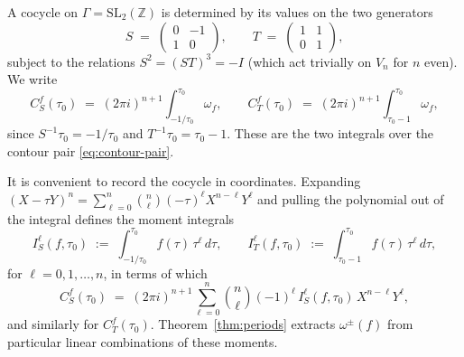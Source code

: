 \documentclass[11pt]{article}
\numberwithin{equation}{section}  %
\newcommand{\ZZ}{\mathbb{Z}}
\newcommand{\SLZ}{\mathrm{SL}_2(\ZZ)}
\begin{document}
A cocycle on $\Gamma = \SLZ$ is determined by its values on the two
generators
\begin{equation}
  S \;=\; \begin{pmatrix} 0 & -1 \\ 1 & 0\end{pmatrix},
  \qquad
  T \;=\; \begin{pmatrix} 1 & 1 \\ 0 & 1\end{pmatrix},
\end{equation}
subject to the relations $S^2 = (ST)^3 = -I$ (which act trivially on
$V_n$ for $n$ even).  We write
\begin{equation}\label{eq:CS-CT-def}
  C^f_S(\tau_0) \;=\; (2\pi i)^{n+1}\!\int_{-1/\tau_0}^{\tau_0}\!\omega_f,
  \qquad
  C^f_T(\tau_0) \;=\; (2\pi i)^{n+1}\!\int_{\tau_0 - 1}^{\tau_0}\!\omega_f,
\end{equation}
since $S^{-1}\tau_0 = -1/\tau_0$ and $T^{-1}\tau_0 = \tau_0 - 1$.
These are the two integrals over the contour pair
\eqref{eq:contour-pair}.

It is convenient to record the cocycle in coordinates.
Expanding $(X - \tau Y)^n = \sum_{\ell=0}^{n} \binom{n}{\ell}(-\tau)^\ell
X^{n-\ell} Y^\ell$ and pulling the polynomial out of the integral defines
the moment integrals
\begin{equation}\label{eq:moment-def}
  I_S^\ell(f, \tau_0) \;:=\; \int_{-1/\tau_0}^{\tau_0}\! f(\tau)\,\tau^\ell\,d\tau,
  \qquad
  I_T^\ell(f, \tau_0) \;:=\; \int_{\tau_0 - 1}^{\tau_0}\! f(\tau)\,\tau^\ell\,d\tau,
\end{equation}
for $\ell = 0, 1, \ldots, n$, in terms of which
\begin{equation}
  C^f_S(\tau_0)
  \;=\; (2\pi i)^{n+1}\!\sum_{\ell=0}^{n}\!\binom{n}{\ell}(-1)^\ell\,
  I_S^\ell(f, \tau_0)\,X^{n-\ell}Y^\ell,
\end{equation}
and similarly for $C^f_T(\tau_0)$.  Theorem~\ref{thm:periods} extracts
$\omega^\pm(f)$ from particular linear combinations of these moments.
\end{document}

